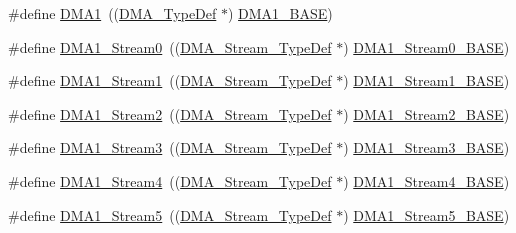 \begin{DoxyCompactItemize}
\item 
\#define \hyperlink{group___peripheral__declaration_gacc16d2a5937f7585320a98f7f6b578f9}{D\+M\+A1}~((\hyperlink{struct_d_m_a___type_def}{D\+M\+A\+\_\+\+Type\+Def} $\ast$) \hyperlink{group___peripheral__memory__map_gab2d8a917a0e4ea99a22ac6ebf279bc72}{D\+M\+A1\+\_\+\+B\+A\+SE})
\item 
\#define \hyperlink{group___peripheral__declaration_ga61247dd5d594289c404dd8774202dfd8}{D\+M\+A1\+\_\+\+Stream0}~((\hyperlink{struct_d_m_a___stream___type_def}{D\+M\+A\+\_\+\+Stream\+\_\+\+Type\+Def} $\ast$) \hyperlink{group___peripheral__memory__map_ga0d3c52aa35dcc68f78b704dfde57ba95}{D\+M\+A1\+\_\+\+Stream0\+\_\+\+B\+A\+SE})
\item 
\#define \hyperlink{group___peripheral__declaration_gaf7d82f110f19982d483eebc465d222b2}{D\+M\+A1\+\_\+\+Stream1}~((\hyperlink{struct_d_m_a___stream___type_def}{D\+M\+A\+\_\+\+Stream\+\_\+\+Type\+Def} $\ast$) \hyperlink{group___peripheral__memory__map_ga5b4152cef577e37eccc9311d8bdbf3c2}{D\+M\+A1\+\_\+\+Stream1\+\_\+\+B\+A\+SE})
\item 
\#define \hyperlink{group___peripheral__declaration_gad0e2140b8eeec3594035f1a7bf2a7250}{D\+M\+A1\+\_\+\+Stream2}~((\hyperlink{struct_d_m_a___stream___type_def}{D\+M\+A\+\_\+\+Stream\+\_\+\+Type\+Def} $\ast$) \hyperlink{group___peripheral__memory__map_ga48a551ee91d3f07dd74347fdb35c703d}{D\+M\+A1\+\_\+\+Stream2\+\_\+\+B\+A\+SE})
\item 
\#define \hyperlink{group___peripheral__declaration_ga96ac1af7a92469fe86a9fbdec091f25d}{D\+M\+A1\+\_\+\+Stream3}~((\hyperlink{struct_d_m_a___stream___type_def}{D\+M\+A\+\_\+\+Stream\+\_\+\+Type\+Def} $\ast$) \hyperlink{group___peripheral__memory__map_gac51deb54ff7cfe1290dfcf517ae67127}{D\+M\+A1\+\_\+\+Stream3\+\_\+\+B\+A\+SE})
\item 
\#define \hyperlink{group___peripheral__declaration_ga87df45f4b82e0b3a8c1b17f1a77aecdb}{D\+M\+A1\+\_\+\+Stream4}~((\hyperlink{struct_d_m_a___stream___type_def}{D\+M\+A\+\_\+\+Stream\+\_\+\+Type\+Def} $\ast$) \hyperlink{group___peripheral__memory__map_ga757a3c0d866c0fe68c6176156065a26b}{D\+M\+A1\+\_\+\+Stream4\+\_\+\+B\+A\+SE})
\item 
\#define \hyperlink{group___peripheral__declaration_gac3abc20f80e25c19b02104ad34eae652}{D\+M\+A1\+\_\+\+Stream5}~((\hyperlink{struct_d_m_a___stream___type_def}{D\+M\+A\+\_\+\+Stream\+\_\+\+Type\+Def} $\ast$) \hyperlink{group___peripheral__memory__map_ga0ded7bed8969fe2e2d616e7f90eb7654}{D\+M\+A1\+\_\+\+Stream5\+\_\+\+B\+A\+SE})
\item 

\end{DoxyCompactItemize}
